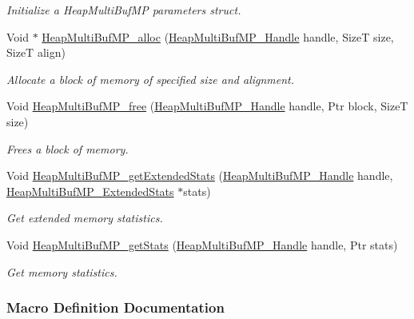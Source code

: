 \begin{DoxyCompactItemize}
\begin{DoxyCompactList}\small\item\em Initialize a Heap\-Multi\-Buf\-M\-P parameters struct. \end{DoxyCompactList}\item 
Void $\ast$ \hyperlink{_heap_multi_buf_m_p_8h_a7a9a09acb3e7d1c942f1535f00bbad1e}{Heap\-Multi\-Buf\-M\-P\-\_\-alloc} (\hyperlink{_heap_multi_buf_m_p_8h_a84a0dbef1eb25a19072649a3c30ed4e6}{Heap\-Multi\-Buf\-M\-P\-\_\-\-Handle} handle, Size\-T size, Size\-T align)
\begin{DoxyCompactList}\small\item\em Allocate a block of memory of specified size and alignment. \end{DoxyCompactList}\item 
Void \hyperlink{_heap_multi_buf_m_p_8h_a1df398e57eed0e1fa1aa1035107adcbf}{Heap\-Multi\-Buf\-M\-P\-\_\-free} (\hyperlink{_heap_multi_buf_m_p_8h_a84a0dbef1eb25a19072649a3c30ed4e6}{Heap\-Multi\-Buf\-M\-P\-\_\-\-Handle} handle, Ptr block, Size\-T size)
\begin{DoxyCompactList}\small\item\em Frees a block of memory. \end{DoxyCompactList}\item 
Void \hyperlink{_heap_multi_buf_m_p_8h_a386420101752537b59e12520aafd9b0d}{Heap\-Multi\-Buf\-M\-P\-\_\-get\-Extended\-Stats} (\hyperlink{_heap_multi_buf_m_p_8h_a84a0dbef1eb25a19072649a3c30ed4e6}{Heap\-Multi\-Buf\-M\-P\-\_\-\-Handle} handle, \hyperlink{struct_heap_multi_buf_m_p___extended_stats}{Heap\-Multi\-Buf\-M\-P\-\_\-\-Extended\-Stats} $\ast$stats)
\begin{DoxyCompactList}\small\item\em Get extended memory statistics. \end{DoxyCompactList}\item 
Void \hyperlink{_heap_multi_buf_m_p_8h_ad1cbb150d20f6c9e12f8c5e13ab70c61}{Heap\-Multi\-Buf\-M\-P\-\_\-get\-Stats} (\hyperlink{_heap_multi_buf_m_p_8h_a84a0dbef1eb25a19072649a3c30ed4e6}{Heap\-Multi\-Buf\-M\-P\-\_\-\-Handle} handle, Ptr stats)
\begin{DoxyCompactList}\small\item\em Get memory statistics. \end{DoxyCompactList}\end{DoxyCompactItemize}


\subsubsection{Macro Definition Documentation}

